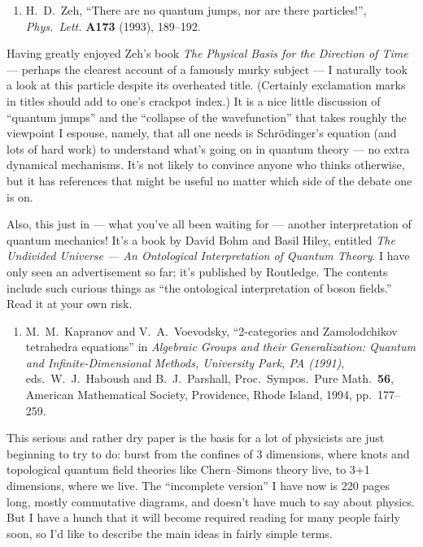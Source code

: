\documentclass{article}
\def\tightlist{}
\begin{document}
\begin{enumerate}
\def\labelenumi{\arabic{enumi})}
\setcounter{enumi}{3}
\tightlist
\item
  H.\ D.\ Zeh, ``There are no quantum jumps, nor are there particles!'', \emph{Phys.\ Lett.} \textbf{A173} (1993), 189--192.
\end{enumerate}
\noindent
Having greatly enjoyed Zeh's book \emph{The Physical Basis for the Direction
of Time} --- perhaps the clearest account of a famously murky subject ---
I naturally took a look at this particle despite its overheated title.
(Certainly exclamation marks in titles should add to one's crackpot
index.) It is a nice little discussion of ``quantum jumps'' and the
``collapse of the wavefunction'' that takes roughly the viewpoint I
espouse, namely, that all one needs is Schr\"odinger's equation (and lots
of hard work) to understand what's going on in quantum theory --- no
extra dynamical mechanisms. It's not likely to convince anyone who
thinks otherwise, but it has references that might be useful no matter
which side of the debate one is on.

Also, this just in --- what you've all been waiting for --- another
interpretation of quantum mechanics! It's a book by David Bohm and Basil
Hiley, entitled \emph{The Undivided Universe --- An Ontological
Interpretation of Quantum Theory}. I have only seen an advertisement so
far; it's published by Routledge. The contents include such curious
things as ``the ontological interpretation of boson fields.'' Read it at
your own risk.

\begin{enumerate}
\def\labelenumi{\arabic{enumi})}
\setcounter{enumi}{4}
\tightlist
\item
  M.\ M.\ Kapranov and V.\ A.\ Voevodsky, 
   ``2-categories and Zamolodchikov tetrahedra equations'' in \emph{Algebraic 
   Groups and their Generalization: Quantum and Infinite-Dimensional Methods, 
   University Park, PA (1991)}, eds.\ W.\ J.\ Haboush and B.\ J.\ Parshall, 
   Proc.\ Sympos.\ Pure Math.\ \textbf{56}, American Mathematical Society,
   Providence, Rhode Island, 1994, pp.\ 177--259.
\end{enumerate}

This serious and rather dry paper is the basis for a lot of physicists
are just beginning to try to do: burst from the confines of 3
dimensions, where knots and topological quantum field theories like
Chern--Simons theory live, to 3+1 dimensions, where we live. The
``incomplete version'' I have now is 220 pages long, mostly commutative
diagrams, and doesn't have much to say about physics. But I have a hunch
that it will become required reading for many people fairly soon, so I'd
like to describe the main ideas in fairly simple terms.
\end{document}
